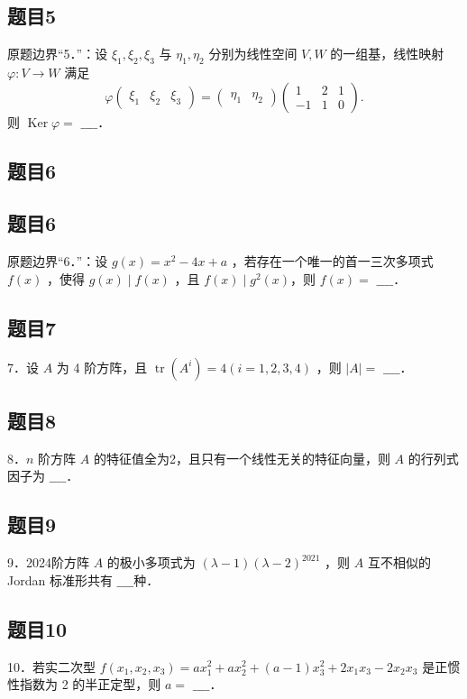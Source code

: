 \documentclass{article}
\begin{document}
\subsection{题目5}
原题边界“5．”：设 \(\xi_{1}, \xi_{2}, \xi_{3}\) 与 \(\eta_{1}, \eta_{2}\) 分别为线性空间 \(V, W\) 的一组基，线性映射 \(\varphi: V \rightarrow W\) 满足
\[
\varphi\left(\begin{array}{lll}
\xi_{1} & \xi_{2} & \xi_{3}
\end{array}\right)=\left(\begin{array}{ll}
\eta_{1} & \eta_{2}
\end{array}\right)\left(\begin{array}{ccc}
1 & 2 & 1 \\
-1 & 1 & 0
\end{array}\right) .
\]
则 \(\operatorname{Ker} \varphi=\) \(\_\_\_\_\)．

\subsection{题目6}

\subsection{题目6}
原题边界“6．”：设 \(g(x)=x^{2}-4 x+a\) ，若存在一个唯一的首一三次多项式 \(f(x)\) ，使得 \(g(x) \mid f(x)\) ，且 \(f(x) \mid g^{2}(x)\)，则 \(f(x)=\) \(\_\_\_\_\)．

\subsection{题目7}
7．设 \(A\) 为 4 阶方阵，且 \(\operatorname{tr}\left(A^{i}\right)=4(i=1,2,3,4)\) ，则 \(|A|=\) \(\_\_\_\_\)．

\subsection{题目8}
8．\(n\) 阶方阵 \(A\) 的特征值全为2，且只有一个线性无关的特征向量，则 \(A\) 的行列式因子为 \(\_\_\_\_\)．

\subsection{题目9}
9．2024阶方阵 \(A\) 的极小多项式为 \((\lambda-1)(\lambda-2)^{2021}\) ，则 \(A\) 互不相似的 Jordan 标准形共有 \(\_\_\_\_\)种．

\subsection{题目10}
10．若实二次型 \(f\left(x_{1}, x_{2}, x_{3}\right)=a x_{1}^{2}+a x_{2}^{2}+(a-1) x_{3}^{2}+2 x_{1} x_{3}-2 x_{2} x_{3}\) 是正惯性指数为 2 的半正定型，则 \(a=\) \(\_\_\_\_\)．
\end{document}
